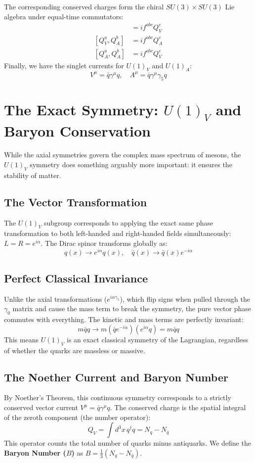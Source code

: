 \documentclass[12pt, a4paper]{article}
\begin{document}
The corresponding conserved charges form the chiral $SU(3) \times SU(3)$ Lie algebra under equal-time commutators:
\begin{align*}
[Q_V^a, Q_V^b] &= i f^{abc} Q_V^c \\
[Q_V^a, Q_A^b] &= i f^{abc} Q_A^c \\
[Q_A^a, Q_A^b] &= i f^{abc} Q_V^c
\end{align*}
Finally, we have the singlet currents for $U(1)_V$ and $U(1)_A$:
\[
V^\mu = \bar{q} \gamma^\mu q, \quad A^\mu = \bar{q} \gamma^\mu \gamma_5 q
\]

\section{The Exact Symmetry: $U(1)_V$ and Baryon Conservation}

While the axial symmetries govern the complex mass spectrum of mesons, the $U(1)_V$ symmetry does something arguably more important: it ensures the stability of matter.

\subsection{The Vector Transformation}
The $U(1)_V$ subgroup corresponds to applying the exact same phase transformation to both left-handed and right-handed fields simultaneously: $L = R = e^{i\alpha}$. The Dirac spinor transforms globally as:
\[
q(x) \rightarrow e^{i\alpha} q(x), \quad \bar{q}(x) \rightarrow \bar{q}(x) e^{-i\alpha}
\]

\subsection{Perfect Classical Invariance}
Unlike the axial transformations ($e^{i\alpha\gamma_5}$), which flip signs when pulled through the $\gamma_0$ matrix and cause the mass term to break the symmetry, the pure vector phase commutes with everything. The kinetic and mass terms are perfectly invariant:
\[
m \bar{q} q \rightarrow m (\bar{q} e^{-i\alpha}) (e^{i\alpha} q) = m \bar{q} q
\]
This means $U(1)_V$ is an exact classical symmetry of the Lagrangian, regardless of whether the quarks are massless or massive.

\subsection{The Noether Current and Baryon Number}
By Noether's Theorem, this continuous symmetry corresponds to a strictly conserved vector current $V^\mu = \bar{q} \gamma^\mu q$. The conserved charge is the spatial integral of the zeroth component (the number operator):
\[
Q_V = \int d^3x \, q^\dagger q = N_q - N_{\bar{q}}
\]
This operator counts the total number of quarks minus antiquarks. We define the \textbf{Baryon Number ($B$)} as $B = \frac{1}{3} (N_q - N_{\bar{q}})$.
\end{document}

